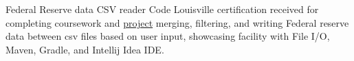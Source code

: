 {Federal Reserve data CSV reader}
{}
{Code Louisville certification received for completing coursework and \href{https://github.com/jacobarchambault/codeloujava}{project} merging, filtering, and writing Federal reserve data between csv files based on user input, showcasing facility with 
	File I/O, Maven, Gradle, and Intellij Idea IDE.}
